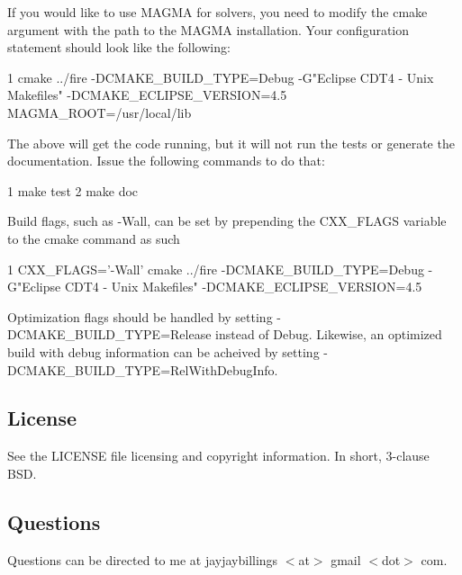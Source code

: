 If you would like to use M\+A\+G\+M\+A for solvers, you need to modify the cmake argument with the path to the M\+A\+G\+M\+A installation. Your configuration statement should look like the following\+:


\begin{DoxyCode}
1 cmake ../fire -DCMAKE\_BUILD\_TYPE=Debug -G"Eclipse CDT4 - Unix Makefiles" -DCMAKE\_ECLIPSE\_VERSION=4.5
       MAGMA\_ROOT=/usr/local/lib
\end{DoxyCode}


The above will get the code running, but it will not run the tests or generate the documentation. Issue the following commands to do that\+: 
\begin{DoxyCode}
1 make test
2 make doc
\end{DoxyCode}


Build flags, such as -\/\+Wall, can be set by prepending the C\+X\+X\+\_\+\+F\+L\+A\+G\+S variable to the cmake command as such


\begin{DoxyCode}
1 CXX\_FLAGS='-Wall' cmake ../fire -DCMAKE\_BUILD\_TYPE=Debug -G"Eclipse CDT4 - Unix Makefiles"
       -DCMAKE\_ECLIPSE\_VERSION=4.5
\end{DoxyCode}


Optimization flags should be handled by setting -\/\+D\+C\+M\+A\+K\+E\+\_\+\+B\+U\+I\+L\+D\+\_\+\+T\+Y\+P\+E=Release instead of Debug. Likewise, an optimized build with debug information can be acheived by setting -\/\+D\+C\+M\+A\+K\+E\+\_\+\+B\+U\+I\+L\+D\+\_\+\+T\+Y\+P\+E=Rel\+With\+Debug\+Info.

\subsection*{License}

See the L\+I\+C\+E\+N\+S\+E file licensing and copyright information. In short, 3-\/clause B\+S\+D.

\subsection*{Questions}

Questions can be directed to me at jayjaybillings $<$at$>$ gmail $<$dot$>$ com. 
